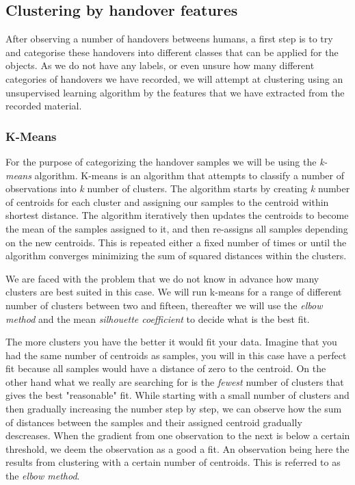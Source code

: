 \subsection{Clustering by handover features}

After observing a number of handovers betweens humans, a first step is to try and categorise these handovers into different classes that can be applied for the objects. As we do not have any labels, or even unsure how many different categories of handovers we have recorded, we will attempt at clustering using an unsupervised learning algorithm by the features that we have extracted from the recorded material.

\subsubsection{K-Means} %

For the purpose of categorizing the handover samples we will be using the \emph{k-means} algorithm. K-means is an algorithm that attempts to classify a number of observations into \emph{k} number of clusters. The algorithm starts by creating \emph{k} number of centroids for each cluster and assigning our samples to the centroid within shortest distance. The algorithm iteratively then updates the centroids to become the mean of the samples assigned to it, and then re-assigns all samples depending on the new centroids. This is repeated either a fixed number of times or until the algorithm converges minimizing the sum of squared distances within the clusters.

We are faced with the problem that we do not know in advance how many clusters are best suited in this case. We will run k-means for a range of different number of clusters between two and fifteen, thereafter we will use the \emph{elbow method} and the mean \emph{silhouette coefficient} to decide what is the best fit.

The more clusters you have the better it would fit your data. Imagine that you had the same number of centroids as samples, you will in this case have a perfect fit because all samples would have a distance of zero to the centroid. On the other hand what we really are searching for is the \emph{fewest} number of clusters that gives the best "reasonable" fit. While starting with a small number of clusters and then gradually increasing the number step by step, we can observe how the sum of distances between the samples and their assigned centroid gradually descreases. When the gradient from one observation to the next is below a certain threshold, we deem the observation as a good a fit. An observation being here the results from clustering with a certain number of centroids. This is referred to as the \emph{elbow method}.

